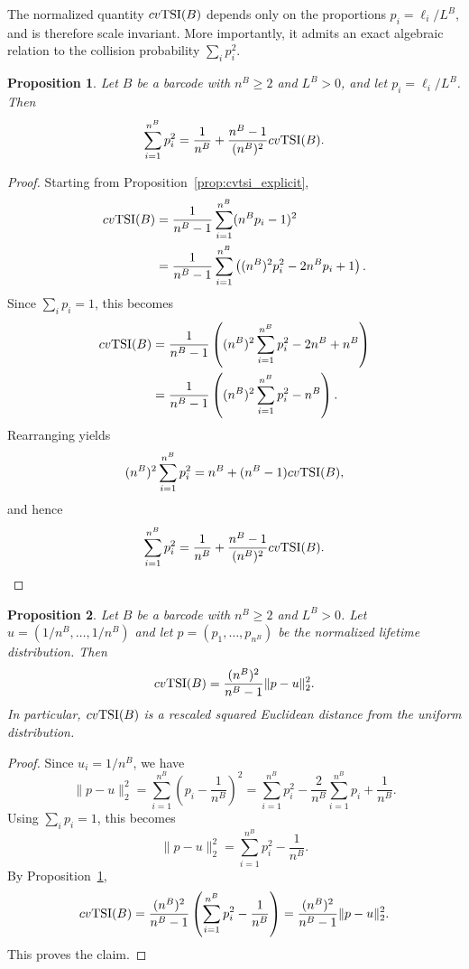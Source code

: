 \documentclass[11pt]{amsart}
\newtheorem{prop}{Proposition}[section]
\theoremstyle{definition}
\newcommand{\tsi}[0]{\textup{TSI}}
\begin{document}
The normalized quantity $cv\tsi(B)$ depends only on the proportions $p_i=\ell_i/L^B$, and is therefore scale invariant. More importantly, it admits an exact algebraic relation to the collision probability $\sum_i p_i^2$.


\begin{prop}\label{prop:collision_identity}
Let $B$ be a barcode with $n^B\geq 2$ and $L^B>0$, and let $p_i=\ell_i/L^B$. Then
\begin{equation}
\sum_{i=1}^{n^B} p_i^2
=
\frac{1}{n^B}
+
\frac{n^B-1}{(n^B)^2}cv\tsi(B).
\end{equation}
\end{prop}

\begin{proof}
Starting from Proposition~\ref{prop:cvtsi_explicit},
\begin{align*}
cv\tsi(B)
&=
\frac{1}{n^B-1}\sum_{i=1}^{n^B}(n^Bp_i-1)^2\\
&=
\frac{1}{n^B-1}\sum_{i=1}^{n^B}\left((n^B)^2p_i^2-2n^Bp_i+1\right).
\end{align*}
Since $\sum_i p_i=1$, this becomes
\begin{align*}
cv\tsi(B)
&=
\frac{1}{n^B-1}
\left((n^B)^2\sum_{i=1}^{n^B}p_i^2-2n^B+n^B\right)\\
&=
\frac{1}{n^B-1}
\left((n^B)^2\sum_{i=1}^{n^B}p_i^2-n^B\right).
\end{align*}
Rearranging yields
\[
(n^B)^2\sum_{i=1}^{n^B}p_i^2
=
n^B+(n^B-1)cv\tsi(B),
\]
and hence
\[
\sum_{i=1}^{n^B} p_i^2
=
\frac{1}{n^B}
+
\frac{n^B-1}{(n^B)^2}cv\tsi(B).
\]
\end{proof}

\begin{prop}\label{prop:cvtsi_l2_uniform}
Let $B$ be a barcode with $n^B\geq 2$ and $L^B>0$. Let $u=(1/n^B,\dots,1/n^B)$ and let $p=(p_1,\dots,p_{n^B})$ be the normalized lifetime distribution. Then
\[
cv\tsi(B)=\frac{(n^B)^2}{n^B-1}\|p-u\|_2^2.
\]
In particular, $cv\tsi(B)$ is a rescaled squared Euclidean distance from the uniform distribution.
\end{prop}

\begin{proof}
Since $u_i=1/n^B$, we have
\[
\|p-u\|_2^2
=
\sum_{i=1}^{n^B}\left(p_i-\frac{1}{n^B}\right)^2
=
\sum_{i=1}^{n^B}p_i^2-\frac{2}{n^B}\sum_{i=1}^{n^B}p_i+\frac{1}{n^B}.
\]
Using $\sum_i p_i=1$, this becomes
\[
\|p-u\|_2^2
=
\sum_{i=1}^{n^B}p_i^2-\frac{1}{n^B}.
\]
By Proposition~\ref{prop:collision_identity},
\[
cv\tsi(B)
=
\frac{(n^B)^2}{n^B-1}\left(\sum_{i=1}^{n^B}p_i^2-\frac{1}{n^B}\right)
=
\frac{(n^B)^2}{n^B-1}\|p-u\|_2^2.
\]
This proves the claim.
\end{proof}
\end{document}
